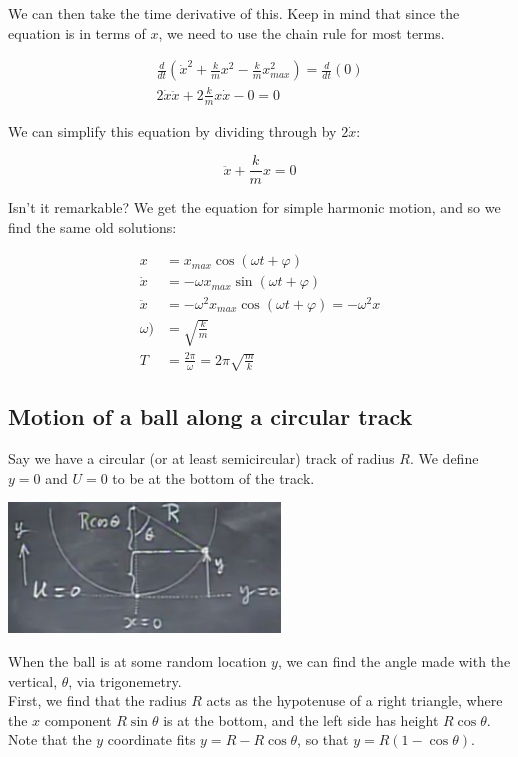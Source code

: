 \documentclass[12pt,a4paper]{report}
\begin{document}
We can then take the time derivative of this. Keep in mind that since the equation is in terms of $x$, we need to use the chain rule for most terms.

\begin{align}
\frac{d}{dt} \left(\dot{x}^2 + \frac{k}{m} x^2 - \frac{k}{m} x_{max}^2\right) = \frac{d}{dt} (0)\\
2 \dot{x} \ddot{x} + 2 \frac{k}{m} x \dot{x} - 0 = 0
\end{align}

We can simplify this equation by dividing through by $2 \dot{x}$:

\begin{equation}
\ddot{x} + \frac{k}{m} x = 0
\end{equation}

Isn't it remarkable? We get the equation for simple harmonic motion, and so we find the same old solutions:

\begin{align}
x        &= x_{max} \cos(\omega t + \varphi)\\
\dot{x}  &= - \omega x_{max} \sin(\omega t + \varphi)\\
\ddot{x} &= - \omega^2 x_{max} \cos(\omega t + \varphi) = -\omega^2 x\\
\omega  )    &= \sqrt{\frac{k}{m}}\\
T           &= \frac{2 \pi}{\omega} = 2 \pi \sqrt{\frac{m}{k}}
\end{align}

\subsection{Motion of a ball along a circular track}

Say we have a circular (or at least semicircular) track of radius $R$. We define $y = 0$ and $U = 0$ to be at the bottom of the track.

\begin{center}
\includegraphics[scale=0.8]{Graphics/lec13_bowl}
\end{center}

When the ball is at some random location $y$, we can find the angle made with the vertical, $\theta$, via trigonemetry.\\
First, we find that the radius $R$ acts as the hypotenuse of a right triangle, where the $x$ component $R \sin \theta$ is at the bottom, and the left side has height $R \cos \theta$. Note that the $y$ coordinate fits $y = R - R\cos \theta$, so that $y = R (1 - \cos \theta)$.
\end{document}
